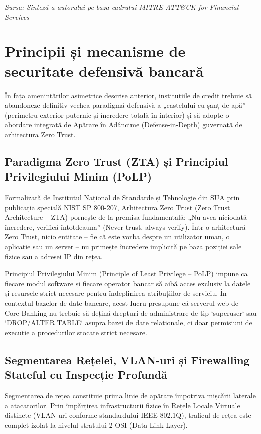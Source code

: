 \textit{Sursa: Sinteză a autorului pe baza cadrului MITRE ATT\&CK for Financial Services}

\section{Principii și mecanisme de securitate defensivă bancară}

În fața amenințărilor asimetrice descrise anterior, instituțiile de credit trebuie să abandoneze definitiv vechea paradigmă defensivă a „castelului cu șanț de apă” (perimetru exterior puternic și încredere totală în interior) și să adopte o abordare integrată de Apărare în Adâncime (Defense-in-Depth) guvernată de arhitectura Zero Trust.

\subsection{Paradigma Zero Trust (ZTA) și Principiul Privilegiului Minim (PoLP)}

Formalizată de Institutul Național de Standarde și Tehnologie din SUA prin publicația specială NIST SP 800-207, Arhitectura Zero Trust (Zero Trust Architecture – ZTA) pornește de la premisa fundamentală: „Nu avea niciodată încredere, verifică întotdeauna” (Never trust, always verify). Într-o arhitectură Zero Trust, nicio entitate – fie că este vorba despre un utilizator uman, o aplicație sau un server – nu primește încredere implicită pe baza poziției sale fizice sau a adresei IP din rețea.

Principiul Privilegiului Minim (Principle of Least Privilege – PoLP) impune ca fiecare modul software și fiecare operator bancar să aibă acces exclusiv la datele și resursele strict necesare pentru îndeplinirea atribuțiilor de serviciu. În contextul bazelor de date bancare, acest lucru presupune că serverul web de Core-Banking nu trebuie să dețină drepturi de administrare de tip `superuser` sau `DROP/ALTER TABLE` asupra bazei de date relaționale, ci doar permisiuni de execuție a procedurilor stocate strict necesare.

\subsection{Segmentarea Rețelei, VLAN-uri și Firewalling Stateful cu Inspecție Profundă}

Segmentarea de rețea constituie prima linie de apărare împotriva mișcării laterale a atacatorilor. Prin împărțirea infrastructurii fizice în Rețele Locale Virtuale distincte (VLAN-uri conforme standardului IEEE 802.1Q), traficul de rețea este complet izolat la nivelul stratului 2 OSI (Data Link Layer).

